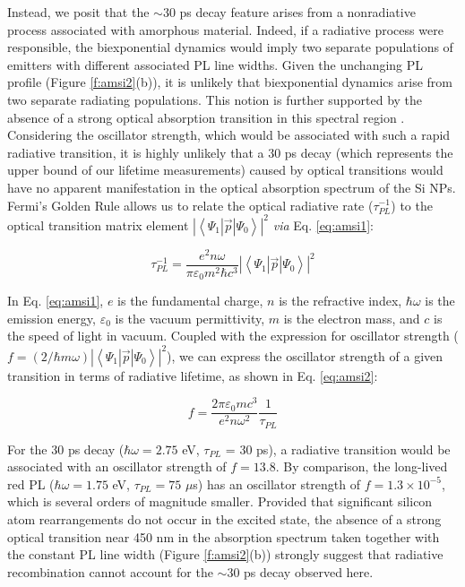 Instead, we posit that the $\sim$30 ps decay feature arises from a nonradiative process associated with amorphous material. Indeed, if a radiative process were responsible, the biexponential dynamics would imply two separate populations of emitters with different associated PL line widths. Given the unchanging PL profile (Figure \ref{f:amsi2}(b)), it is unlikely that biexponential dynamics arise from two separate radiating populations. This notion is further supported by the absence of a strong optical absorption transition in this spectral region \cite{gresback2011combined}. Considering the oscillator strength, which would be associated with such a rapid radiative transition, it is highly unlikely that a 30 ps decay (which represents the upper bound of our lifetime measurements) caused by optical transitions would have no apparent manifestation in the optical absorption spectrum of the Si NPs. Fermi's Golden Rule allows us to relate the optical radiative rate ($\tau_{PL}^{-1}$) to the optical transition matrix element $|\left\langle\Psi_1|\vec{p}|\Psi_0\right\rangle|^2$ \emph{via} Eq. \ref{eq:amsi1}:

\begin{equation}\label{eq:amsi1}
\tau_{PL}^{-1} = \frac{e^2n\omega}{\pi\varepsilon_0m^2\hbar c^3}|\left\langle\Psi_1|\vec{p}|\Psi_0\right\rangle|^2
\end{equation}

In Eq. \ref{eq:amsi1}, $e$ is the fundamental charge, $n$ is the refractive index, $\hbar\omega$ is the emission energy, $\varepsilon_0$ is the vacuum permittivity, $m$ is the electron mass, and $c$ is the speed of light in vacuum.  Coupled with the expression for oscillator strength ($f = (2/\hbar m\omega)|\left\langle\Psi_1|\vec{p}|\Psi_0\right\rangle|^2$), we can express the oscillator strength of a given transition in terms of radiative lifetime, as shown in Eq. \ref{eq:amsi2}:

\begin{equation}\label{eq:amsi2}
f = \frac{2\pi\varepsilon_0mc^3}{e^2n\omega^2}\frac{1}{\tau_{PL}}
\end{equation}

For the 30 ps decay ($\hbar\omega = 2.75$ eV, $\tau_{PL}$ = 30 ps), a radiative transition would be associated with an oscillator strength of $f = 13.8$.  By comparison, the long-lived red PL ($\hbar\omega = 1.75$ eV, $\tau_{PL} = 75$ $\mu$s) has an oscillator strength of $f = 1.3 \times 10^{-5}$, which is several orders of magnitude smaller. Provided that significant silicon atom rearrangements do not occur in the excited state, the absence of a strong optical transition near 450 nm in the absorption spectrum taken together with the constant PL line width (Figure \ref{f:amsi2}(b)) strongly suggest that radiative recombination cannot account for the $\sim$30 ps decay observed here. \par

